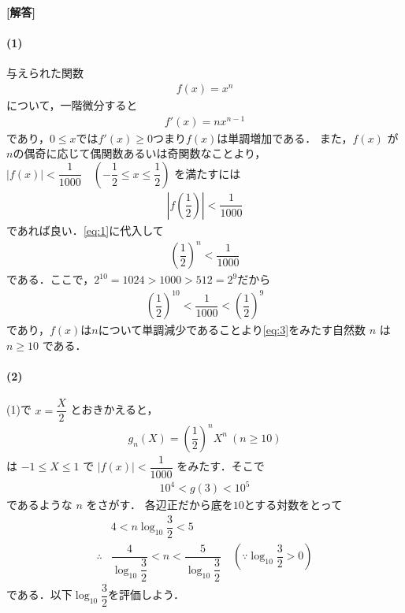 \documentclass[../../main.tex]{subfiles}
\begin{document}
\begin{oframed}
  
\end{oframed}

{\bf [解答]}
\paragraph{(1)}

与えられた関数
\begin{align}
  f(x) = x^n \label{eq:1}
\end{align}
について，一階微分すると
\begin{align}
  f'(x) = n x^{n-1} \label{eq:2}
\end{align}
であり，$0 \le x$では$f'(x)\ge0$つまり$f(x)$は単調増加である．
また，$f(x)$ が$n$の偶奇に応じて偶関数あるいは奇関数なことより，
$|f(x)| < \dfrac{1}{1000} \quad \left(-\dfrac{1}{2} \le x \le \dfrac{1}{2}\right)$ を満たすには
\begin{align}
  \left| f\left(\dfrac{1}{2}\right) \right| < \dfrac{1}{1000}
\end{align}
であれば良い．\cref{eq:1}に代入して
\begin{align}
  \left(\dfrac{1}{2}\right)^n < \dfrac{1}{1000} \label{eq:3}
\end{align}
である．ここで，$2^{10} = 1024 > 1000 > 512 = 2^{9}$だから
\begin{align}
  \left(\dfrac{1}{2}\right)^{10} < \dfrac{1}{1000} < \left(\dfrac{1}{2}\right)^9
\end{align}
であり，$f(x)$は$n$について単調減少であることより\cref{eq:3}をみたす自然数 $n$ は $n \ge 10$ である．

\paragraph{(2)}

(1)で $x = \dfrac{X}{2}$ とおきかえると，
\begin{align}
  g_{n}(X) = \left(\dfrac{1}{2}\right)^n X^n \ (n \ge 10) \label{eq:4}
\end{align}
は $-1 \le X \le 1$ で $|f(x)| < \dfrac{1}{1000}$ をみたす．そこで
\begin{align}
  10^4 < g(3) < 10^5 \label{eq:5}
\end{align}
であるような $n$ をさがす．
各辺正だから底を$10$とする対数をとって
\begin{align}
  & 4 < n \log_{10} \dfrac{3}{2} < 5 \\
  \therefore
  & \dfrac{4}{\log_{10} \dfrac{3}{2}} < n < \dfrac{5}{\log_{10} \dfrac{3}{2}} \quad (\because \log_{10} \dfrac{3}{2} > 0) \label{eq:6}
\end{align}
である．以下$\log_{10} \dfrac{3}{2}$を評価しよう．
\end{document}
